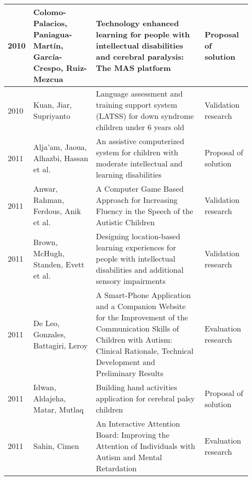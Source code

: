 \documentclass[utf8,english]{gradu3}
\begin{document}
\begin{longtable}{|>{\scriptsize}l|>{\scriptsize}p{3cm}|>{\scriptsize}p{8cm}|>{\scriptsize}p{2.4cm}|}
  2010          & Colomo-Palacios, Paniagua-Martín, García-Crespo, Ruiz-Mezcua         & Technology enhanced learning for people with intellectual disabilities and cerebral paralysis: The MAS platform                                                                              & Proposal of solution       \\ \hline
  2010          & Kuan, Jiar, Supriyanto                                               & Language assessment and training support system (LATSS) for down syndrome children under 6 years old                                                                                         & Validation research        \\ \hline
  2011          & Alja'am, Jaoua, Alhazbi, Hassan et al.                               & An assistive computerized system for children with moderate intellectual and learning disabilities                                                                                           & Proposal of solution       \\ \hline
  2011          & Anwar, Rahman, Ferdous, Anik et al.                                  & A Computer Game Based Approach for Increasing Fluency in the Speech of the Autistic Children                                                                                                 & Validation research        \\ \hline
  2011          & Brown, McHugh, Standen, Evett et al.                                 & Designing location-based learning experiences for people with intellectual disabilities and additional sensory impairments                                                                   & Validation research        \\ \hline
  2011          & De Leo, Gonzales, Battagiri, Leroy                                   & A Smart-Phone Application and a Companion Website for the Improvement of the Communication Skills of Children with Autism: Clinical Rationale, Technical Development and Preliminary Results & Evaluation research        \\ \hline
  2011          & Idwan, Aldajeha, Matar, Mutlaq                                       & Building hand activities application for cerebral palsy children                                                                                                                             & Proposal of solution       \\ \hline
  2011          & Sahin, Cimen                                                         & An Interactive Attention Board: Improving the Attention of Individuals with Autism and Mental Retardation                                                                                    & Evaluation research        \\ \hline

\end{longtable}
\end{document}
